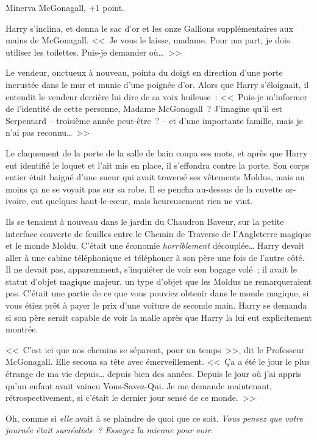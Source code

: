 Minerva McGonagall, +1 point.

Harry s'inclina, et donna le sac d'or et les onze Gallions supplémentaires aux mains de McGonagall. <<~Je vous le laisse, madame. Pour ma part, je dois utiliser les toilettes. Puis-je demander où…~>>

Le vendeur, onctueux à nouveau, pointa du doigt en direction d'une porte incrustée dans le mur et munie d'une poignée d'or. Alors que Harry s'éloignait, il entendit le vendeur derrière lui dire de sa voix huileuse~: <<~Puis-je m'informer de l'identité de cette personne, Madame McGonagall~? J'imagine qu'il est Serpentard -- troisième année peut-être~? -- et d'une importante famille, mais je n'ai pas reconnu…~>>

Le claquement de la porte de la salle de bain coupa ses mots, et après que Harry eut identifié le loquet et l'ait mis en place, il s'effondra contre la porte. Son corps entier était baigné d'une sueur qui avait traversé ses vêtements Moldus, mais au moins ça ne se voyait pas sur sa robe. Il se pencha au-dessus de la cuvette or-ivoire, eut quelques haut-le-cœur, mais heureusement rien ne vint.

\later

Ils se tenaient à nouveau dans le jardin du Chaudron Baveur, sur la petite interface couverte de feuilles entre le Chemin de Traverse de l'Angleterre magique et le monde Moldu. C'était une économie \emph{horriblement} découplée… Harry devait aller à une cabine téléphonique et téléphoner à son père une fois de l'autre côté. Il ne devait pas, apparemment, s'inquiéter de voir son bagage volé~; il avait le statut d'objet magique majeur, un type d'objet que les Moldus ne remarqueraient pas. C'était une partie de ce que vous pouviez obtenir dans le monde magique, si vous étiez prêt à payer le prix d'une voiture de seconde main. Harry se demanda si son père serait capable de voir la malle après que Harry la lui eut explicitement montrée.

<<~C'est ici que nos chemins se séparent, pour un temps~>>, dit le Professeur McGonagall. Elle secoua sa tête avec émerveillement. <<~Ça a été le jour le plus étrange de ma vie depuis… depuis bien des années. Depuis le jour où j'ai appris qu'un enfant avait vaincu Vous-Savez-Qui. Je me demande maintenant, rétrospectivement, si c'était le dernier jour sensé de ce monde.~>>

Oh, comme si \emph{elle} avait à se plaindre de quoi que ce soit. \emph{Vous pensez que votre journée était surréaliste~? Essayez la mienne pour voir}.


